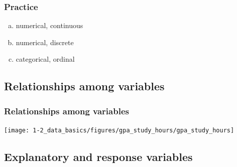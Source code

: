 
\begin{frame}
\frametitle{Practice}


\begin{enumerate}[(a)]
\item numerical, continuous
\item numerical, discrete
\item categorical, ordinal
\end{enumerate}

\end{frame}


\subsection{Relationships among variables}


\begin{frame}
\frametitle{Relationships among variables}


\begin{center}
\texttt{[image: 1-2\_data\_basics/figures/gpa\_study\_hours/gpa\_study\_hours]}
\end{center}

\pause



\end{frame}


\subsection{Explanatory and response variables}


